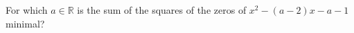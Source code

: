 For which $a \in \mathbb{R}$ is the sum of the squares of the zeros of $x^2 - (a - 2)x - a - 1$ minimal?

